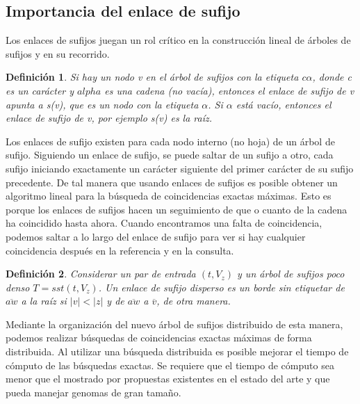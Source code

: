 \documentclass[11pt,a4paper,english]{article}
\newtheorem{mydef}{Definición}
\begin{document}
\subsection{Importancia del enlace de sufijo}
Los enlaces de sufijos juegan un rol crítico en la construcción lineal de árboles de sufijos y en su
recorrido.
\begin{mydef}
  Si hay un nodo v en el árbol de sufijos con la etiqueta $c\alpha$, donde c es un carácter y $alpha$
  es una cadena (no vacía), entonces el enlace de sufijo de v apunta a s(v), que es un nodo con la
  etiqueta $\alpha$. Si $\alpha$ está vacío, entonces el enlace de sufijo de v, por ejemplo s(v) es la
  raíz. 
\end{mydef}
Los enlaces de sufijo existen para cada nodo interno (no hoja) de un árbol de sufijo. Siguiendo un 
enlace de sufijo, se puede saltar de un sufijo a otro, cada sufijo iniciando exactamente un carácter
siguiente del primer carácter de su sufijo precedente. De tal manera que usando enlaces de sufijos es
posible obtener un algoritmo lineal para la búsqueda de coincidencias exactas máximas. Esto es porque
los enlaces de sufijos hacen un seguimiento de que o cuanto de la cadena ha coincidido hasta ahora.
Cuando encontramos una falta de coincidencia, podemos saltar a lo largo del enlace de sufijo para 
ver si hay cualquier coincidencia despu\'es en la referencia y en la consulta.
\begin{mydef}
  Considerar un par de entrada $(t,V_{z})$ y un árbol de sufijos poco denso $T=sst(t,V_{z})$. Un enlace
  de sufijo disperso es un borde sin etiquetar de $\overline{aw}$ a la raíz si $|v|<|z|$ y de $\overline{aw}$
  a $\overline{v}$, de otra manera.
\end{mydef}
Mediante la organización del nuevo árbol de sufijos distribuido de esta manera, 
podemos realizar búsquedas de coincidencias exactas máximas de forma distribuida. Al
utilizar una búsqueda distribuida es posible mejorar el tiempo de cómputo de 
las búsquedas exactas. Se requiere que el tiempo de cómputo sea menor que el 
mostrado por propuestas existentes en el estado del arte y que pueda manejar
genomas de gran tamaño.\\
\end{document}
